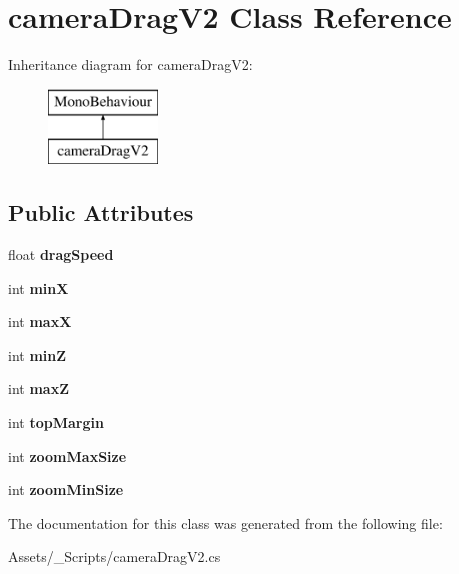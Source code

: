 \hypertarget{classcamera_drag_v2}{}\section{camera\+Drag\+V2 Class Reference}
\label{classcamera_drag_v2}
Inheritance diagram for camera\+Drag\+V2\+:\begin{figure}[H]
\begin{center}
\leavevmode
\includegraphics[height=2.000000cm]{classcamera_drag_v2}
\end{center}
\end{figure}
\subsection*{Public Attributes}
\begin{DoxyCompactItemize}
\item 
\hypertarget{classcamera_drag_v2_aa63d90bcfd0e4fa348855460560fc8fd}{}float {\bfseries drag\+Speed}\label{classcamera_drag_v2_aa63d90bcfd0e4fa348855460560fc8fd}

\item 
\hypertarget{classcamera_drag_v2_a9007ac93c7cde56d8479104c9f4c1f5d}{}int {\bfseries min\+X}\label{classcamera_drag_v2_a9007ac93c7cde56d8479104c9f4c1f5d}

\item 
\hypertarget{classcamera_drag_v2_a86d90a914fece47ed346eada75a65373}{}int {\bfseries max\+X}\label{classcamera_drag_v2_a86d90a914fece47ed346eada75a65373}

\item 
\hypertarget{classcamera_drag_v2_a923a09f1df1dc349b5edfb92ecf775d4}{}int {\bfseries min\+Z}\label{classcamera_drag_v2_a923a09f1df1dc349b5edfb92ecf775d4}

\item 
\hypertarget{classcamera_drag_v2_a7fb0fd25618ed259c3340bc953fcc96b}{}int {\bfseries max\+Z}\label{classcamera_drag_v2_a7fb0fd25618ed259c3340bc953fcc96b}

\item 
\hypertarget{classcamera_drag_v2_ac10694452821d5120cae9981ec8058cd}{}int {\bfseries top\+Margin}\label{classcamera_drag_v2_ac10694452821d5120cae9981ec8058cd}

\item 
\hypertarget{classcamera_drag_v2_aed6ee912be0ae6789cedb03e6244c1ed}{}int {\bfseries zoom\+Max\+Size}\label{classcamera_drag_v2_aed6ee912be0ae6789cedb03e6244c1ed}

\item 
\hypertarget{classcamera_drag_v2_a2f6741d854354d83f88cd0ec6a2b6bab}{}int {\bfseries zoom\+Min\+Size}\label{classcamera_drag_v2_a2f6741d854354d83f88cd0ec6a2b6bab}

\end{DoxyCompactItemize}


The documentation for this class was generated from the following file\+:\begin{DoxyCompactItemize}
\item 
Assets/\+\_\+\+Scripts/camera\+Drag\+V2.\+cs\end{DoxyCompactItemize}

